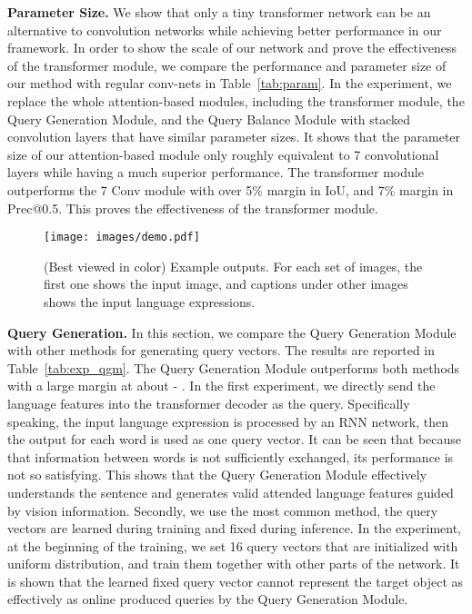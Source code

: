 \documentclass[10pt,twocolumn,letterpaper]{article}
\begin{document}
\textbf{Parameter Size.} We show that only a tiny transformer network can be an alternative to convolution networks while achieving better performance in our framework. In order to show the scale of our network and prove the effectiveness of the transformer module, we compare the performance and parameter size of our method with regular conv-nets in Table~\ref{tab:param}.
In the experiment, we replace the whole attention-based modules, including the transformer module, the Query Generation Module, and the Query Balance Module with stacked  convolution layers that have similar parameter sizes. It shows that the parameter size of our attention-based module only roughly equivalent to 7 convolutional layers while having a much superior performance. The transformer module outperforms the 7 Conv module with over 5\% margin in IoU, and 7\% margin in Prec@0.5. This proves the effectiveness of the transformer module.




\begin{figure*}[t!]
   \begin{center}
      \texttt{[image: images/demo.pdf]}
   \end{center}
   \vspace{-0.2in}
   \caption{(Best viewed in color) Example outputs. For each set of images, the first one shows the input image, and captions under other images shows the input language expressions.}
  \vspace{-0.1in}
   \label{fig:demo}
\end{figure*}

\textbf{Query Generation.} In this section, we compare the Query Generation Module with other methods for generating query vectors. The results are reported in Table~\ref{tab:exp_qgm}. The Query Generation Module outperforms both methods with a large margin at about  - . In the first experiment, we directly send the language features into the transformer decoder as the query. Specifically speaking, the input language expression is processed by an RNN network, then the output for each word is used as one query vector. It can be seen that because that information between words is not sufficiently exchanged, its performance is not so satisfying. This shows that the Query Generation Module effectively understands the sentence and generates valid attended language features guided by vision information. Secondly, we use the most common method, \ie the query vectors are learned during training and fixed during inference. In the experiment, at the beginning of the training, we set 16 query vectors that are initialized with uniform distribution, and train them together with other parts of the network. It is shown that the learned fixed query vector cannot represent the target object as effectively as online produced queries by the Query Generation Module. 
\end{document}
